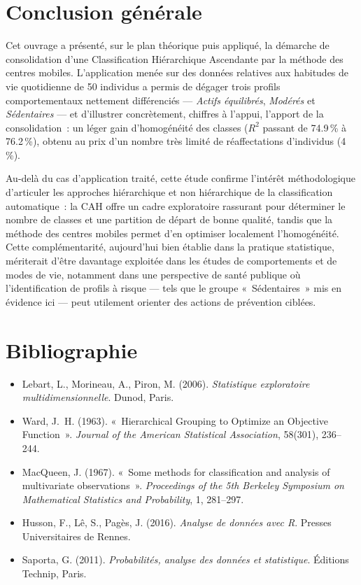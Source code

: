 \documentclass[11pt,a4paper,oneside]{book}
\begin{document}
\chapter{Conclusion générale}

Cet ouvrage a présenté, sur le plan théorique puis appliqué, la démarche de consolidation d'une Classification Hiérarchique Ascendante par la méthode des centres mobiles. L'application menée sur des données relatives aux habitudes de vie quotidienne de 50 individus a permis de dégager trois profils comportementaux nettement différenciés --- \emph{Actifs équilibrés}, \emph{Modérés} et \emph{Sédentaires} --- et d'illustrer concrètement, chiffres à l'appui, l'apport de la consolidation~: un léger gain d'homogénéité des classes ($R^2$ passant de 74.9\,\% à 76.2\,\%), obtenu au prix d'un nombre très limité de réaffectations d'individus (4\,\%).

Au-delà du cas d'application traité, cette étude confirme l'intérêt méthodologique d'articuler les approches hiérarchique et non hiérarchique de la classification automatique~: la CAH offre un cadre exploratoire rassurant pour déterminer le nombre de classes et une partition de départ de bonne qualité, tandis que la méthode des centres mobiles permet d'en optimiser localement l'homogénéité. Cette complémentarité, aujourd'hui bien établie dans la pratique statistique, mériterait d'être davantage exploitée dans les études de comportements et de modes de vie, notamment dans une perspective de santé publique où l'identification de profils à risque --- tels que le groupe «~Sédentaires~» mis en évidence ici --- peut utilement orienter des actions de prévention ciblées.

\backmatter
\chapter*{Bibliographie}
\begin{itemize}
  \item Lebart, L., Morineau, A., Piron, M. (2006). \emph{Statistique exploratoire multidimensionnelle}. Dunod, Paris.
  \item Ward, J.~H. (1963). «~Hierarchical Grouping to Optimize an Objective Function~». \emph{Journal of the American Statistical Association}, 58(301), 236--244.
  \item MacQueen, J. (1967). «~Some methods for classification and analysis of multivariate observations~». \emph{Proceedings of the 5th Berkeley Symposium on Mathematical Statistics and Probability}, 1, 281--297.
  \item Husson, F., Lê, S., Pagès, J. (2016). \emph{Analyse de données avec R}. Presses Universitaires de Rennes.
  \item Saporta, G. (2011). \emph{Probabilités, analyse des données et statistique}. Éditions Technip, Paris.
\end{itemize}
\end{document}
